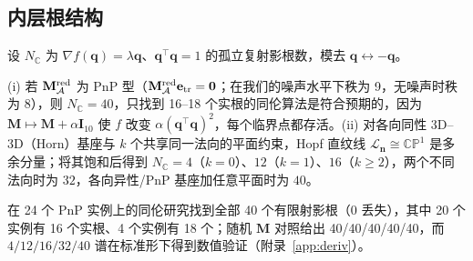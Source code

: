 \subsection{内层根结构}\label{sec:spectrum}
设 $N_{\mathbb C}$ 为 $\nabla f(\mathbf q)=\lambda\mathbf q$、$\mathbf q^\top\mathbf q=1$ 的孤立复射影根数，模去 $\mathbf q\leftrightarrow-\mathbf q$。
\begin{theorem}[内层根谱]\label{thm:spectrum}
(i) 若 $\mathbf M^{\rm red}_{\mathcal A}$ 为 PnP 型（$\mathbf M^{\rm red}_{\mathcal A}\mathbf e_{\rm tr}=\mathbf 0$；在我们的噪声水平下秩为 9，无噪声时秩为 8），则 $N_{\mathbb C}=40$，只找到 16--18 个实根的同伦算法是符合预期的，因为 $\mathbf M\mapsto\mathbf M+\alpha\mathbf I_{10}$ 使 $f$ 改变 $\alpha(\mathbf q^\top\mathbf q)^2$，每个临界点都存活。(ii) 对各向同性 3D--3D（Horn）基座与 $k$ 个共享同一法向的平面约束，Hopf 直纹线 $\mathcal L_{\mathbf n}\cong\mathbb{CP}^1$ 是多余分量；将其饱和后得到 $N_{\mathbb C}=4$（$k=0$）、$12$（$k=1$）、$16$（$k\ge2$），两个不同法向时为 $32$，各向异性/PnP 基座加任意平面时为 $40$。
\end{theorem}
在 24 个 PnP 实例上的同伦研究找到全部 40 个有限射影根（0 丢失），其中 20 个实例有 16 个实根、4 个实例有 18 个；随机 $\mathbf M$ 对照给出 40/40/40/40/40，而 $4/12/16/32/40$ 谱在标准形下得到数值验证（附录~\ref{app:deriv}）。
